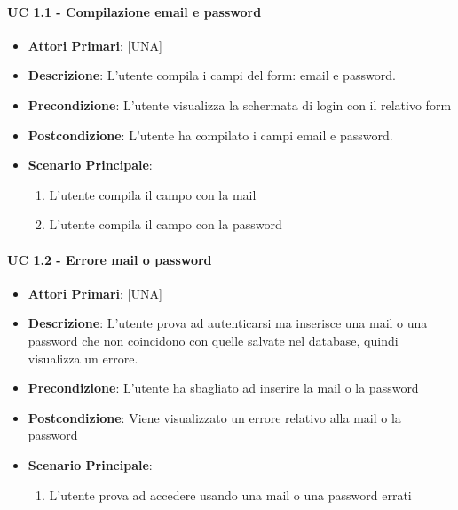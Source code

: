 			\paragraph{UC 1.1 - Compilazione email e password}
			\begin{itemize}
				\item \textbf{Attori Primari}: [UNA]
				\item \textbf{Descrizione}: L'utente compila i campi del form: email e password.
				\item \textbf{Precondizione}: L'utente visualizza la schermata di login con il relativo form
				\item \textbf{Postcondizione}: L'utente ha compilato i campi email e password.
				\item \textbf{Scenario Principale}:
				\begin{enumerate}
					\item{L'utente compila il campo con la mail}
					\item{L'utente compila il campo con la password}
				\end{enumerate}	
			\end{itemize}

			\paragraph{UC 1.2 - Errore mail o password}
			\begin{itemize}
				\item \textbf{Attori Primari}: [UNA]
				\item \textbf{Descrizione}: L'utente prova ad autenticarsi ma inserisce una mail o una password che non coincidono con quelle salvate nel database, quindi visualizza un errore.
				\item \textbf{Precondizione}: L'utente ha sbagliato ad inserire la mail o la password
				\item \textbf{Postcondizione}: Viene visualizzato un errore relativo alla mail o la password
				\item \textbf{Scenario Principale}:
				\begin{enumerate}
					\item{L'utente prova ad accedere usando una mail o una password errati}
				\end{enumerate}	
			\end{itemize}

